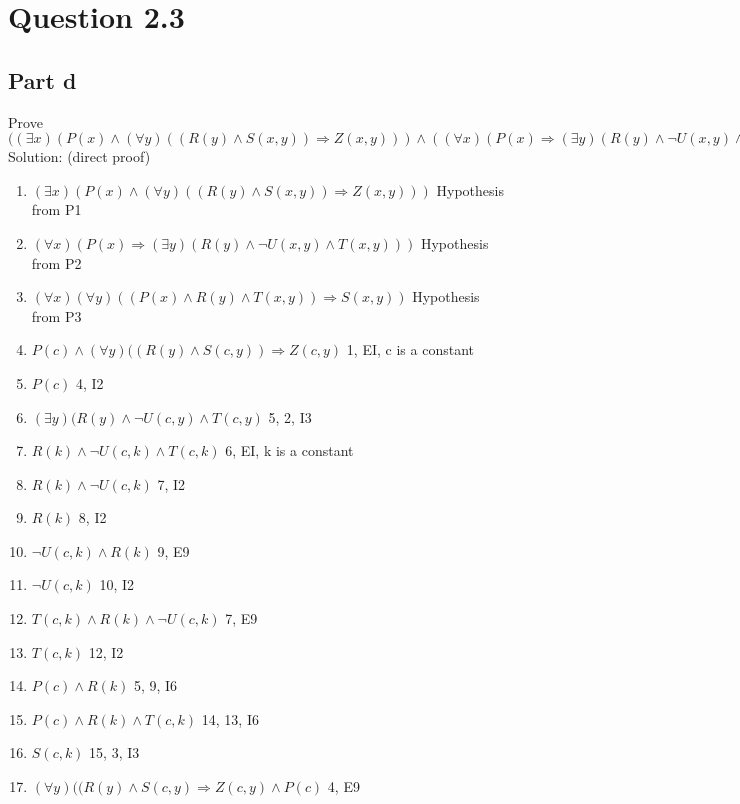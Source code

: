\documentclass{article}
\begin{document}
	\section{Question 2.3}
		\subsection{Part d}
			Prove $((\exists x)(P(x) \land (\forall y)((R(y) \land S(x, y)) \Rightarrow Z(x, y))) \land ((\forall x)(P(x) \Rightarrow (\exists y)(R(y) \land \lnot U(x, y) \land T(x, y)))) \land ((\forall x)(\forall y)((P(x) \land R(y) \land T(x, y)) \Rightarrow S(x, y))) \Rightarrow ((\exists x)(\exists y)(P(x) \land R(x) \land Z(x, y) \land \lnot U(x, y)))$ \\
			Solution: (direct proof) \\
			\begin{enumerate}
				\item $(\exists x)(P(x) \land (\forall y)((R(y) \land S(x, y)) \Rightarrow Z(x, y)))$ \hfill Hypothesis from P1
				\item $(\forall x)(P(x) \Rightarrow (\exists y)(R(y) \land \lnot U(x, y) \land T(x, y)))$ \hfill Hypothesis from P2
				\item $(\forall x)(\forall y)((P(x) \land R(y) \land T(x, y)) \Rightarrow S(x, y))$ \hfill Hypothesis from P3
				\item $P(c) \land (\forall y)((R(y) \land S(c, y)) \Rightarrow Z(c, y)$ \hfill 1, EI, c is a constant
				\item $P(c)$ \hfill 4, I2
				\item $(\exists y)(R(y) \land \lnot U(c, y) \land T(c, y)$ \hfill 5, 2, I3
				\item $R(k) \land \lnot U(c, k) \land T(c, k)$ \hfill 6, EI, k is a constant
				\item $R(k) \land \lnot U(c, k)$ \hfill 7, I2
				\item $R(k)$ \hfill 8, I2
				\item $\lnot U(c, k) \land R(k)$ \hfill 9, E9
				\item $\lnot U(c, k)$ \hfill 10, I2
				\item $T(c, k) \land R(k) \land \lnot U(c, k)$ \hfill 7, E9
				\item $T(c, k)$ \hfill 12, I2
				\item $P(c) \land R(k)$ \hfill 5, 9, I6
				\item $P(c) \land R(k) \land T(c, k)$ \hfill 14, 13, I6
				\item $S(c, k)$ \hfill 15, 3, I3
				\item $(\forall y)((R(y) \land S(c, y) \Rightarrow Z(c, y) \land P(c)$ \hfill 4, E9

\end{enumerate}
\end{document}
